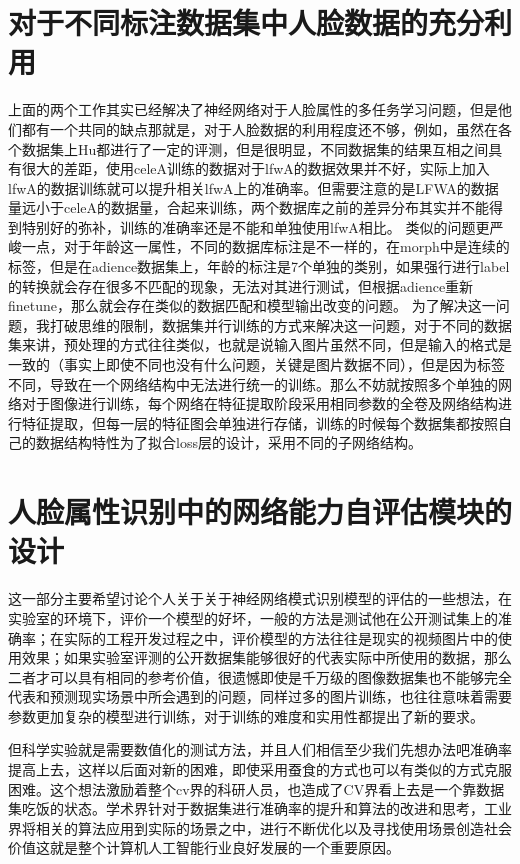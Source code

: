 \section{对于不同标注数据集中人脸数据的充分利用}
上面的两个工作其实已经解决了神经网络对于人脸属性的多任务学习问题，但是他们都有一个共同的缺点那就是，对于人脸数据的利用程度还不够，例如，虽然在各个数据集上Hu都进行了一定的评测，但是很明显，不同数据集的结果互相之间具有很大的差距，使用celeA训练的数据对于lfwA的数据效果并不好，实际上加入lfwA的数据训练就可以提升相关lfwA上的准确率。但需要注意的是LFWA的数据量远小于celeA的数据量，合起来训练，两个数据库之前的差异分布其实并不能得到特别好的弥补，训练的准确率还是不能和单独使用lfwA相比。
类似的问题更严峻一点，对于年龄这一属性，不同的数据库标注是不一样的，在morph中是连续的标签，但是在adience数据集上，年龄的标注是7个单独的类别，如果强行进行label的转换就会存在很多不匹配的现象，无法对其进行测试，但根据adience重新finetune，那么就会存在类似的数据匹配和模型输出改变的问题。
为了解决这一问题，我打破思维的限制，数据集并行训练的方式来解决这一问题，对于不同的数据集来讲，预处理的方式往往类似，也就是说输入图片虽然不同，但是输入的格式是一致的（事实上即使不同也没有什么问题，关键是图片数据不同），但是因为标签不同，导致在一个网络结构中无法进行统一的训练。那么不妨就按照多个单独的网络对于图像进行训练，每个网络在特征提取阶段采用相同参数的全卷及网络结构进行特征提取，但每一层的特征图会单独进行存储，训练的时候每个数据集都按照自己的数据结构特性为了拟合loss层的设计，采用不同的子网络结构。



\section{人脸属性识别中的网络能力自评估模块的设计}
这一部分主要希望讨论个人关于关于神经网络模式识别模型的评估的一些想法，在实验室的环境下，评价一个模型的好坏，一般的方法是测试他在公开测试集上的准确率；在实际的工程开发过程之中，评价模型的方法往往是现实的视频图片中的使用效果；如果实验室评测的公开数据集能够很好的代表实际中所使用的数据，那么二者才可以具有相同的参考价值，很遗憾即使是千万级的图像数据集也不能够完全代表和预测现实场景中所会遇到的问题，同样过多的图片训练，也往往意味着需要参数更加复杂的模型进行训练，对于训练的难度和实用性都提出了新的要求。

但科学实验就是需要数值化的测试方法，并且人们相信至少我们先想办法吧准确率提高上去，这样以后面对新的困难，即使采用蚕食的方式也可以有类似的方式克服困难。这个想法激励着整个cv界的科研人员，也造成了CV界看上去是一个靠数据集吃饭的状态。学术界针对于数据集进行准确率的提升和算法的改进和思考，工业界将相关的算法应用到实际的场景之中，进行不断优化以及寻找使用场景创造社会价值这就是整个计算机人工智能行业良好发展的一个重要原因。

